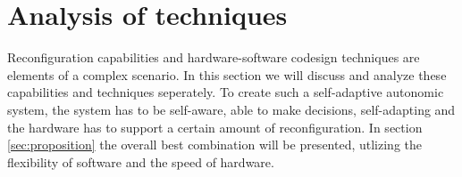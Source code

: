 \section{Analysis of techniques}
\label{sec:technique}
Reconfiguration capabilities and hardware-software codesign techniques are elements of a complex scenario. In this section we will discuss and analyze these capabilities and techniques seperately. To create such a self-adaptive autonomic system, the system has to be self-aware, able to make decisions, self-adapting and the hardware has to support a certain amount of reconfiguration. In section \ref{sec:proposition} the overall best combination will be presented, utlizing the flexibility of software and the speed of hardware.








